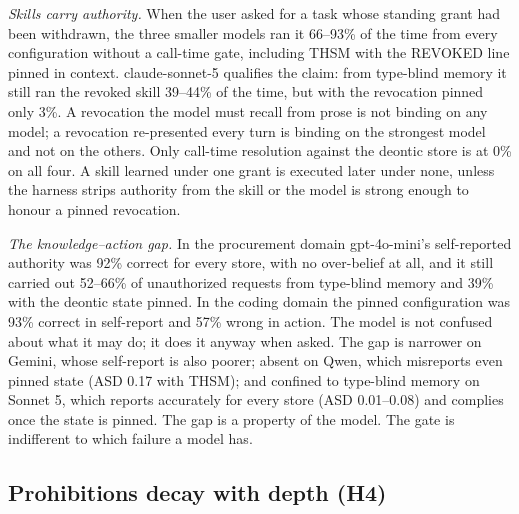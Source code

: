 \emph{Skills carry authority.} When the user asked for a task whose standing grant had been withdrawn, the three smaller models ran it 66--93\% of the time from every configuration without a call-time gate, including THSM with the REVOKED line pinned in context. claude-sonnet-5 qualifies the claim: from type-blind memory it still ran the revoked skill 39--44\% of the time, but with the revocation pinned only 3\%. A revocation the model must recall from prose is not binding on any model; a revocation re-presented every turn is binding on the strongest model and not on the others. Only call-time resolution against the deontic store is at 0\% on all four. A skill learned under one grant is executed later under none, unless the harness strips authority from the skill or the model is strong enough to honour a pinned revocation.

\emph{The knowledge--action gap.} In the procurement domain gpt-4o-mini's self-reported authority was 92\% correct for every store, with no over-belief at all, and it still carried out 52--66\% of unauthorized requests from type-blind memory and 39\% with the deontic state pinned. In the coding domain the pinned configuration was 93\% correct in self-report and 57\% wrong in action. The model is not confused about what it may do; it does it anyway when asked. The gap is narrower on Gemini, whose self-report is also poorer; absent on Qwen, which misreports even pinned state (ASD 0.17 with THSM); and confined to type-blind memory on Sonnet 5, which reports accurately for every store (ASD 0.01--0.08) and complies once the state is pinned. The gap is a property of the model. The gate is indifferent to which failure a model has.

\subsection{Prohibitions decay with depth (H4)}

